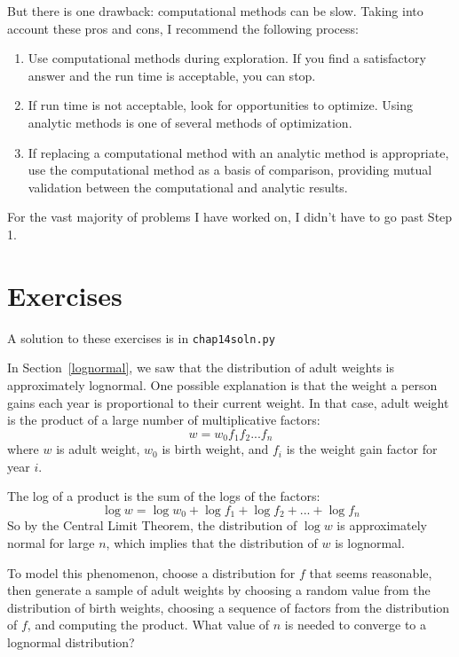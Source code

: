 \documentclass[12pt]{book}
\begin{document}
But there is one drawback: computational methods can be slow.  Taking
into account these pros and cons, I recommend the following process:

\begin{enumerate}

\item Use computational methods during exploration.  If you find a
  satisfactory answer and the run time is acceptable, you can stop.

\item If run time is not acceptable, look for opportunities to
  optimize.  Using analytic methods is one of several methods of
  optimization.

\item If replacing a computational method with an analytic method is
  appropriate, use the computational method as a basis of comparison, 
  providing mutual validation between the computational and
  analytic results.

\end{enumerate}

For the vast majority of problems I have worked on, I didn't have
to go past Step 1.


\section{Exercises}

A solution to these exercises is in \verb"chap14soln.py"

\begin{exercise}
\label{log_clt}
In Section~\ref{lognormal}, we saw that the distribution
of adult weights is approximately lognormal.  One possible
explanation is that the weight a person
gains each year is proportional to their current weight.
In that case, adult weight is the product of a large number
of multiplicative factors:
%
\[ w = w_0 f_1 f_2 ... f_n  \]
%
where $w$ is adult weight, $w_0$ is birth weight, and $f_i$
is the weight gain factor for year $i$.

The log of a product is the sum of the logs of the
factors:
%
\[ \log w = \log w_0 + \log f_1 + \log f_2 + ... + \log f_n \]
%
So by the Central Limit Theorem, the distribution of $\log w$ is
approximately normal for large $n$, which implies that the
distribution of $w$ is lognormal.

To model this phenomenon, choose a distribution for $f$ that seems
reasonable, then generate a sample of adult weights by choosing a
random value from the distribution of birth weights, choosing a
sequence of factors from the distribution of $f$, and computing the
product.  What value of $n$ is needed to converge to a lognormal
distribution?


\end{exercise}
\end{document}

